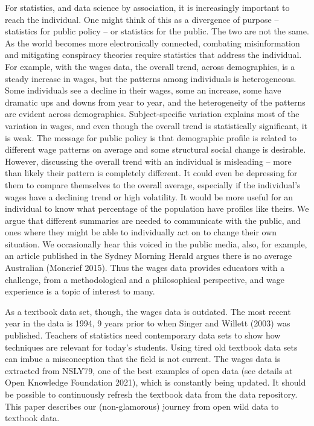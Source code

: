 \documentclass[12pt]{article}
\begin{document}
For statistics, and data science by association, it is increasingly important to reach the individual. One might think of this as a divergence of purpose -- statistics for public policy -- or statistics for the public. The two are not the same. As the world becomes more electronically connected, combating misinformation and mitigating conspiracy theories require statistics that address the individual. For example, with the wages data, the overall trend, across demographics, is a steady increase in wages, but the patterns among individuals is heterogeneous. Some individuals see a decline in their wages, some an increase, some have dramatic ups and downs from year to year, and the heterogeneity of the patterns are evident across demographics. Subject-specific variation explains most of the variation in wages, and even though the overall trend is statistically significant, it is weak. The message for public policy is that demographic profile is related to different wage patterns on average and some structural social change is desirable. However, discussing the overall trend with an individual is misleading -- more than likely their pattern is completely different. It could even be depressing for them to compare themselves to the overall average, especially if the individual's wages have a declining trend or high volatility. It would be more useful for an individual to know what percentage of the population have profiles like theirs. We argue that different summaries are needed to communicate with the public, and ones where they might be able to individually act on to change their own situation. We occasionally hear this voiced in the public media, also, for example, an article published in the Sydney Morning Herald argues there is no average Australian (Moncrief 2015). Thus the wages data provides educators with a challenge, from a methodological and a philosophical perspective, and wage experience is a topic of interest to many.

As a textbook data set, though, the wages data is outdated. The most recent year in the data is 1994, 9 years prior to when Singer and Willett (2003) was published. Teachers of statistics need contemporary data sets to show how techniques are relevant for today's students. Using tired old textbook data sets can imbue a misconception that the field is not current. The wages data is extracted from NSLY79, one of the best examples of open data (see details at Open Knowledge Foundation 2021), which is constantly being updated. It should be possible to continuously refresh the textbook data from the data repository. This paper describes our (non-glamorous) journey from open wild data to textbook data.
\end{document}

